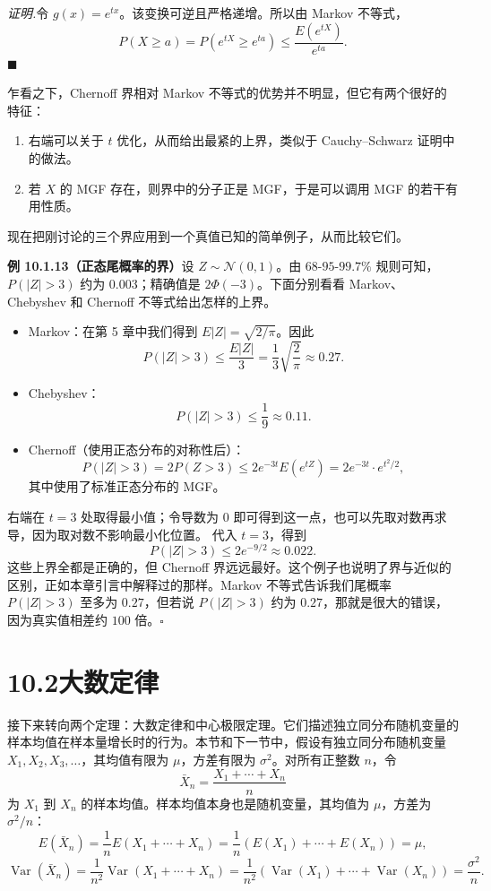 \documentclass[UTF8, 12pt, fontset=fandol, oneside]{ctexart}
\begin{document}
\noindent\textit{证明.}\quad 令 $g(x)=e^{tx}$。该变换可逆且严格递增。所以由 Markov 不等式，
\[
  P(X\ge a)=P(e^{tX}\ge e^{ta})\le \frac{E(e^{tX})}{e^{ta}}.
\]
$\blacksquare$

乍看之下，Chernoff 界相对 Markov 不等式的优势并不明显，但它有两个很好的特征：
\begin{enumerate}
  \item 右端可以关于 $t$ 优化，从而给出最紧的上界，类似于 Cauchy--Schwarz 证明中的做法。
  \item 若 $X$ 的 MGF 存在，则界中的分子正是 MGF，于是可以调用 MGF 的若干有用性质。
\end{enumerate}

现在把刚讨论的三个界应用到一个真值已知的简单例子，从而比较它们。

\noindent\textbf{例 10.1.13（正态尾概率的界）}\quad 设 $Z\sim\mathcal N(0,1)$。由 $68$-$95$-$99.7\%$ 规则可知，$P(|Z|>3)$ 约为 $0.003$；精确值是 $2\Phi(-3)$。下面分别看看 Markov、Chebyshev 和 Chernoff 不等式给出怎样的上界。

\begin{itemize}
  \item Markov：在第 5 章中我们得到 $E|Z|=\sqrt{2/\pi}$。因此
  \[
    P(|Z|>3)\le \frac{E|Z|}{3}
    =\frac13\sqrt{\frac2\pi}\approx 0.27.
  \]

  \item Chebyshev：
  \[
    P(|Z|>3)\le \frac19\approx 0.11.
  \]

  \item Chernoff（使用正态分布的对称性后）：
  \[
    P(|Z|>3)=2P(Z>3)\le 2e^{-3t}E(e^{tZ})
    =2e^{-3t}\cdot e^{t^2/2},
  \]
  其中使用了标准正态分布的 MGF。
\end{itemize}

右端在 $t=3$ 处取得最小值；令导数为 $0$ 即可得到这一点，也可以先取对数再求导，因为取对数不影响最小化位置。
代入 $t=3$，得到
\[
  P(|Z|>3)\le 2e^{-9/2}\approx 0.022.
\]
这些上界全都是正确的，但 Chernoff 界远远最好。这个例子也说明了界与近似的区别，正如本章引言中解释过的那样。Markov 不等式告诉我们尾概率 $P(|Z|>3)$ 至多为 $0.27$，但若说 $P(|Z|>3)$ 约为 $0.27$，那就是很大的错误，因为真实值相差约 $100$ 倍。$\square$

\section*{10.2\quad 大数定律}

接下来转向两个定理：大数定律和中心极限定理。它们描述独立同分布随机变量的样本均值在样本量增长时的行为。本节和下一节中，假设有独立同分布随机变量 $X_1,X_2,X_3,\ldots$，其均值有限为 $\mu$，方差有限为 $\sigma^2$。对所有正整数 $n$，令
\[
  \bar X_n=\frac{X_1+\cdots+X_n}{n}
\]
为 $X_1$ 到 $X_n$ 的样本均值。样本均值本身也是随机变量，其均值为 $\mu$，方差为 $\sigma^2/n$：
\[
  E(\bar X_n)=\frac1nE(X_1+\cdots+X_n)
  =\frac1n(E(X_1)+\cdots+E(X_n))=\mu,
\]
\[
  \operatorname{Var}(\bar X_n)
  =\frac1{n^2}\operatorname{Var}(X_1+\cdots+X_n)
  =\frac1{n^2}(\operatorname{Var}(X_1)+\cdots+\operatorname{Var}(X_n))
  =\frac{\sigma^2}{n}.
\]
\end{document}
